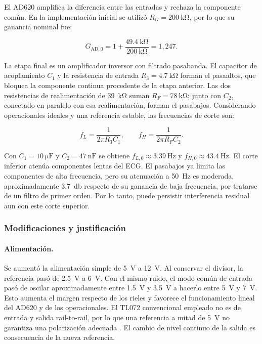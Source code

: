\documentclass[10pt]{article}
\begin{document}
El AD620 amplifica la diferencia entre las entradas y rechaza la componente común. En la implementación inicial se utilizó $R_G=\SI{200}{\kilo\ohm}$, por lo que su ganancia nominal fue:

\begin{equation} G_{\mathrm{AD},0}=1+\frac{\SI{49.4}{\kilo\ohm}}{\SI{200}{\kilo\ohm}}=1{,}247. \end{equation}

La etapa final es un amplificador inversor con filtrado pasabanda. El capacitor de acoplamiento $C_1$ y la resistencia de entrada $R_3=\SI{4.7}{\kilo\ohm}$ forman el pasaaltos, que bloquea la componente continua procedente de la etapa anterior. Las dos resistencias de realimentación de \SI{39}{\kilo\ohm} suman $R_F=\SI{78}{\kilo\ohm}$; junto con $C_2$, conectado en paralelo con esa realimentación, forman el pasabajos. Considerando operacionales ideales y una referencia estable, las frecuencias de corte son:

\begin{equation} f_L=\frac{1}{2\pi R_3 C_1}, \qquad f_H=\frac{1}{2\pi R_F C_2}. \end{equation}

Con $C_1=\SI{10}{\micro\farad}$ y $C_2=\SI{47}{\nano\farad}$ se obtiene $f_{L,0}\approx\SI{3.39}{\hertz}$ y $f_{H,0}\approx\SI{43.4}{\hertz}$. El corte inferior atenúa componentes lentas del ECG. El pasabajos ya limita las componentes de alta frecuencia, pero su atenuación a \SI{50}{\hertz} es moderada, aproximadamente \SI{3.7}{\decibel} respecto de su ganancia de baja frecuencia, por tratarse de un filtro de primer orden. Por lo tanto, puede persistir interferencia residual aun con este corte superior.

\subsubsection{Modificaciones y justificación}

\paragraph{Alimentación.}

Se aumentó la alimentación simple de \SI{5}{\volt} a \SI{12}{\volt}. Al conservar el divisor, la referencia pasó de \SI{2.5}{\volt} a \SI{6}{\volt}. Con el mismo ruido, el modo común de entrada pasó de oscilar aproximadamente entre \SI{1.5}{\volt} y \SI{3.5}{\volt} a hacerlo entre \SI{5}{\volt} y \SI{7}{\volt}. Esto aumenta el margen respecto de los rieles y favorece el funcionamiento lineal del AD620 y de los operacionales. El TL072 convencional empleado no es de entrada y salida rail-to-rail, por lo que una referencia a mitad de \SI{5}{\volt} no garantiza una polarización adecuada \cite{ti_tl072}. El cambio de nivel continuo de la salida es consecuencia de la nueva referencia.
\end{document}
